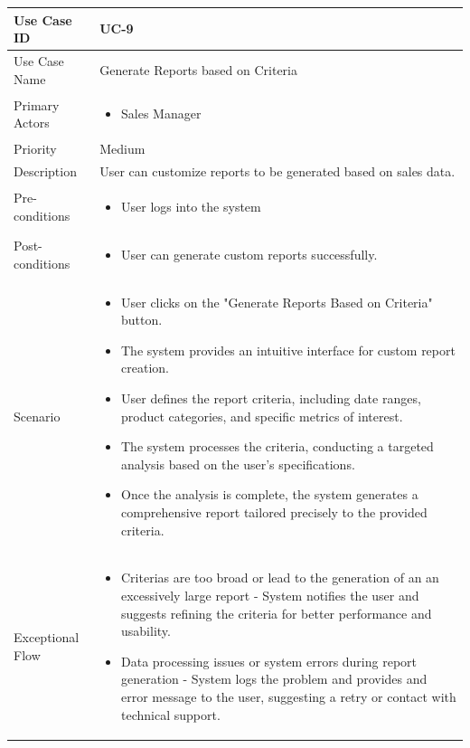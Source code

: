 \vspace{12pt}

\begin{tabularx}{\textwidth}{|l|X|}
\hline
Use Case ID & UC-9 \\
\hline
Use Case Name & Generate Reports based on Criteria\\
\hline
Primary Actors & 
\begin{itemize}
    \item Sales Manager
\end{itemize} \\
\hline
Priority & Medium \\
\hline
Description & User can customize reports to be generated based on sales data. \\
\hline
Pre-conditions & 
\begin{itemize}
    \item User logs into the system
\end{itemize} \\
\hline
Post-conditions & 
\begin{itemize}
    \item User can generate custom reports successfully.
\end{itemize} \\
\hline
Scenario & 
\begin{itemize}
    \item User clicks on the "Generate Reports Based on Criteria" button. 
    \item The system provides an intuitive interface for custom report creation.
    \item User defines the report criteria, including date ranges, product categories, and specific metrics of interest.
    \item The system processes the criteria, conducting a targeted analysis based on the user's specifications.
    \item Once the analysis is complete, the system generates a comprehensive report tailored precisely to the provided criteria.
\end{itemize}\\
\hline
Exceptional Flow & 
\begin{itemize}
    \item Criterias are too broad or lead to the generation of an an excessively large report - System notifies the user and suggests refining the criteria for better performance and usability.
    \item Data processing issues or system errors during report generation - System logs the problem and provides and error message to the user, suggesting a retry or contact with technical support.
\end{itemize}\\
\hline
\end{tabularx}

